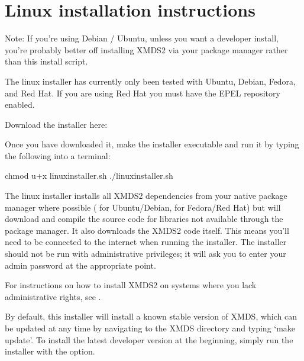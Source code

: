 \documentclass[letterpaper,10pt,english]{sphinxmanual}
\begin{document}
\section{Linux installation instructions}
\label{\detokenize{installation:linux-installation-instructions}}\label{\detokenize{installation:linux-installation}}\label{\detokenize{installation:index-1}}
\sphinxAtStartPar
Note: If you’re using Debian / Ubuntu, unless you want a developer install, you’re probably better off installing XMDS2 via your package manager rather than this install script.

\sphinxAtStartPar
The linux installer has currently only been tested with Ubuntu, Debian, Fedora, and Red Hat. If you are using Red Hat you must have the EPEL repository enabled.

\sphinxAtStartPar
Download the installer here: 

\sphinxAtStartPar
Once you have downloaded it, make the installer executable and run it by typing the following into a terminal:

\begin{sphinxVerbatim}[commandchars=\\\{\}]
chmod u+x linux\PYGZus{}installer.sh
./linux\PYGZus{}installer.sh
\end{sphinxVerbatim}

\sphinxAtStartPar
The linux installer installs all XMDS2 dependencies from your native package manager where possible ( for Ubuntu/Debian,  for Fedora/Red Hat) but will download and compile the source code for libraries not available through the package manager. It also downloads the XMDS2 code itself. This means you’ll need to be connected to the internet when running the installer. The installer should not be run with administrative privileges; it will ask you to enter your admin password at the appropriate point.

\sphinxAtStartPar
For instructions on how to install XMDS2 on systems where you lack administrative rights, see {\hyperref[\detokenize{installation:manualinstallation}]{}}.

\sphinxAtStartPar
By default, this installer will install a known stable version of XMDS, which can be updated at any time by navigating to the XMDS directory and typing ‘make update’. To install the latest developer version at the beginning, simply run the installer with the  option.
\end{document}
